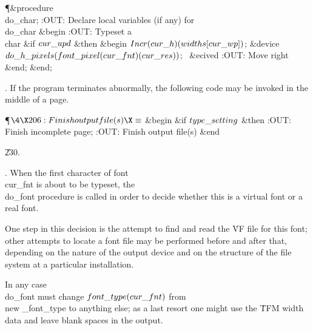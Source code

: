 \Y\P\4\&{procedure}\1\  \\{do\_char};\6
:OUT: Declare local variables (if any) for \\{do\_char}\X\2\6
\&{begin} :OUT: Typeset a \\{char}\X\6
\&{if} $\\{cur\_upd}$ \1\&{then}\6
\&{begin} $\\{Incr}(\\{cur\_h})(\\{widths}[\\{cur\_wp}])$;\6
\&{device} $\\{do\_h\_pixels}(\\{font\_pixel}(\\{cur\_fnt})(\\{cur\_res}))$;%
\ \&{ecived}\6
:OUT: Move right\X\6
\&{end};\2\6
\&{end};\par
\fi

. If the program terminates abnormally, the following code may be
invoked in the middle of a page.

\Y\P$\4\X206:Finish output file(s)\X\S$\6
\&{begin} \&{if} $\\{type\_setting}$ \1\&{then}\5
:OUT: Finish incomplete page\X;\2\6
:OUT: Finish output file(s)\X\6
\&{end}\par
\U230.\fi

. When the first character of font~\\{cur\_fnt} is about to be typeset,
the \\{do\_font} procedure is called in order to decide whether this is
a virtual font or a real font.

One step in this decision is the attempt to find and read the \.{VF}
file for this font; other attempts to locate a font file may be performed
before and after that, depending on the nature of the output device and
on the structure of the file system at a particular installation.

In any case \\{do\_font} must change $\\{font\_type}(\\{cur\_fnt})$ from \\{new%
\_font\_type}
to anything else; as a last resort one might use the \.{TFM} width data
and leave blank spaces in the output.

